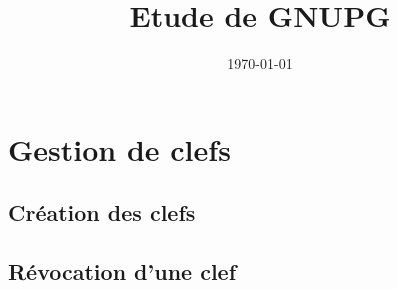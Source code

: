 \documentclass{../res/univ-projet}
\title{Etude de GNUPG}
\author{}
\date{\today}
\begin{document}
\maketitle
\newpage
\tableofcontents
\newpage

\section{Gestion de clefs}
\subsection{Création des clefs}
  
\subsection{Révocation d'une clef}
  
\end{document}
